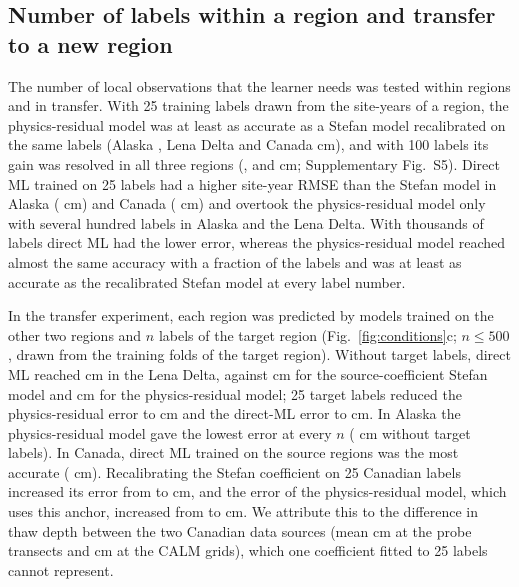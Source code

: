 \subsection{Number of labels within a region and transfer to a new region}
The number of local observations that the learner needs was tested within regions and in transfer. With 25 training labels drawn from the site-years of a region, the physics-residual model was at least as accurate as a Stefan model recalibrated on the same labels (Alaska \nllAkRotwfive, Lena Delta \nllLeRotwfive{} and Canada \nllCaRotwfive{} cm), and with 100 labels its gain was resolved in all three regions (\nllAkRohundred, \nllLeRohundred{} and \nllCaRohundred{} cm; Supplementary Fig.~S5). Direct ML trained on 25 labels had a higher site-year RMSE than the Stefan model in Alaska (\nllAkDztwfive{} cm) and Canada (\nllCaDztwfive{} cm) and overtook the physics-residual model only with several hundred labels in Alaska and the Lena Delta. With thousands of labels direct ML had the lower error, whereas the physics-residual model reached almost the same accuracy with a fraction of the labels and was at least as accurate as the recalibrated Stefan model at every label number.

In the transfer experiment, each region was predicted by models trained on the other two regions and $n$ labels of the target region (Fig.~\ref{fig:conditions}c; $n \leq 500$, drawn from the training folds of the target region). Without target labels, direct ML reached \ntlrmseLeDszero{} cm in the Lena Delta, against \ntlrmseLePzzero{} cm for the source-coefficient Stefan model and \ntlrmseLeRszero{} cm for the physics-residual model; 25 target labels reduced the physics-residual error to \ntlrmseLeRstwfive{} cm and the direct-ML error to \ntlrmseLeDstwfive{} cm. In Alaska the physics-residual model gave the lowest error at every $n$ (\ntlrmseAkRszero{} cm without target labels). In Canada, direct ML trained on the source regions was the most accurate (\ntlrmseCaDszero{} cm). Recalibrating the Stefan coefficient on 25 Canadian labels increased its error from \ntlrmseCaPzzero{} to \ntlrmseCaPntwfive{} cm, and the error of the physics-residual model, which uses this anchor, increased from \ntlrmseCaRszero{} to \ntlrmseCaRstwfive{} cm. We attribute this to the difference in thaw depth between the two Canadian data sources (mean \nsrcCaABoVEObs{} cm at the probe transects and \nsrcCaCALMObs{} cm at the CALM grids), which one coefficient fitted to 25 labels cannot represent.

